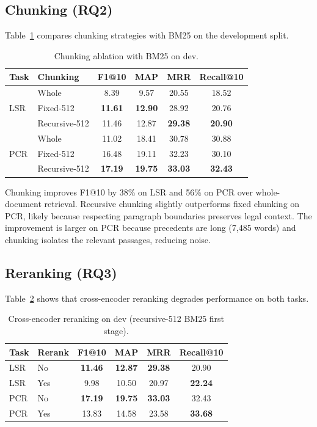 \documentclass[11pt]{article}
\begin{document}
\subsection{Chunking (RQ2)}

Table~\ref{tab:chunking} compares chunking strategies with BM25 on the development split.

\begin{table}[h]
\centering
\caption{Chunking ablation with BM25 on dev.}
\label{tab:chunking}
\begin{tabular}{llcccc}
\toprule
Task & Chunking & F1@10 & MAP & MRR & Recall@10 \\
\midrule
\multirow{3}{*}{LSR} & Whole & 8.39 & 9.57 & 20.55 & 18.52 \\
 & Fixed-512 & \textbf{11.61} & \textbf{12.90} & 28.92 & 20.76 \\
 & Recursive-512 & 11.46 & 12.87 & \textbf{29.38} & \textbf{20.90} \\
\midrule
\multirow{3}{*}{PCR} & Whole & 11.02 & 18.41 & 30.78 & 30.88 \\
 & Fixed-512 & 16.48 & 19.11 & 32.23 & 30.10 \\
 & Recursive-512 & \textbf{17.19} & \textbf{19.75} & \textbf{33.03} & \textbf{32.43} \\
\bottomrule
\end{tabular}
\end{table}

Chunking improves F1@10 by 38\% on LSR and 56\% on PCR over whole-document retrieval. Recursive chunking slightly outperforms fixed chunking on PCR, likely because respecting paragraph boundaries preserves legal context. The improvement is larger on PCR because precedents are long (7{,}485 words) and chunking isolates the relevant passages, reducing noise.

\subsection{Reranking (RQ3)}

Table~\ref{tab:rerank} shows that cross-encoder reranking degrades performance on both tasks.

\begin{table}[h]
\centering
\caption{Cross-encoder reranking on dev (recursive-512 BM25 first stage).}
\label{tab:rerank}
\begin{tabular}{llcccc}
\toprule
Task & Rerank & F1@10 & MAP & MRR & Recall@10 \\
\midrule
LSR & No & \textbf{11.46} & \textbf{12.87} & \textbf{29.38} & 20.90 \\
LSR & Yes & 9.98 & 10.50 & 20.97 & \textbf{22.24} \\
PCR & No & \textbf{17.19} & \textbf{19.75} & \textbf{33.03} & 32.43 \\
PCR & Yes & 13.83 & 14.58 & 23.58 & \textbf{33.68} \\
\bottomrule
\end{tabular}
\end{table}
\end{document}
